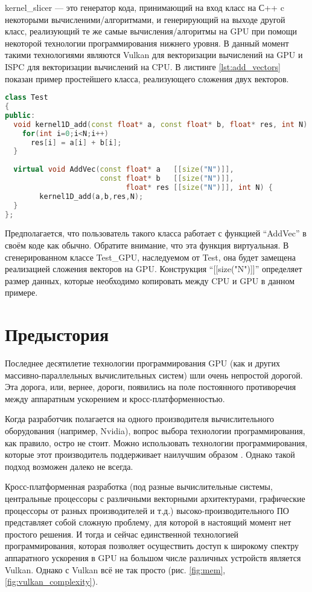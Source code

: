 \documentclass[11pt,fleqn,english,russian]{report} %
\begin{document}
kernel\_slicer --- это генератор кода, принимающий на вход класс на С++ c некоторыми вычисленими/алгоритмами, и генерирующий на выходе другой класс, реализующий те же самые вычисления/алгоритмы на GPU при помощи некоторой технологии программирования нижнего уровня. В данный момент такими технологиями являются Vulkan для векторизации вычислений на GPU и ISPC \cite{ispc} для векторизации вычислений на CPU. В листинге \ref{lst:add_vectors} показан пример простейшего класса, реализующего сложения двух векторов.

\begin{lstlisting}[language=C++, caption=сложение двух векторов]
class Test 
{
public:	
  void kernel1D_add(const float* a, const float* b, float* res, int N) {
    for(int i=0;i<N;i++)
      res[i] = a[i] + b[i];
  } 
	
  virtual void AddVec(const float* a   [[size("N")]], 
                      const float* b   [[size("N")]], 
                            float* res [[size("N")]], int N) {
		kernel1D_add(a,b,res,N); 
  } 	
};
\end{lstlisting}\label{lst:add_vectors}

Предполагается, что пользователь такого класса работает с функцией ``AddVec'' в своём коде как обычно. Обратите внимание, что эта функция виртуальная. В сгенерированном классе Test\_GPU, наследуемом от Test, она будет замещена реализацией сложения векторов на GPU. Конструкция ``[[size("N")]]'' определяет размер данных, которые необходимо копировать между CPU и GPU в данном примере.

\section{Предыстория}

Последнее десятилетие технологии программирования GPU (как и других массивно-параллельных вычислительных систем) шли очень непростой дорогой. Эта дорога, или, вернее, дороги, появились на поле постоянного противоречия между аппаратным ускорением и кросс-платформенностью. 

Когда разработчик полагается на одного производителя вычислительного оборудования (например, Nvidia), вопрос выбора технологии программирования, как правило, остро не стоит. Можно использовать технологии программирования, которые этот производитель поддерживает наилучшим образом \cite{NVCPP,CUDA,OpenACC}. Однако такой подход возможен далеко не всегда. 

Кросс-платформенная разработка (под разные вычислительные системы, центральные процессоры с различными векторными архитектурами, графические процессоры от разных производителей и т.д.)  высоко-производительного ПО представляет собой сложную проблему, для которой в настоящий момент нет простого решения. И тогда и сейчас единственной технологией программирования, которая позволяет осуществить доступ к широкому спектру аппаратного ускорения в GPU на большом числе различных устройств является Vulkan. Однако с Vulkan всё не так просто (рис. \ref{fig:mem}, \ref{fig:vulkan_complexity}). 
\end{document}
